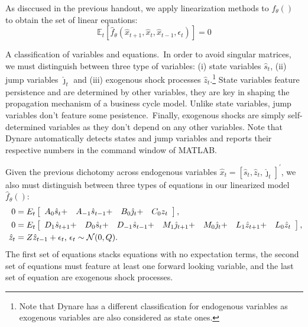 \documentclass[a4paper,12pt]{article}%
\begin{document}
As disccused in the previous handout, we apply linearization methods to
$f_{\theta}()$ to obtain the set of linear equations:%
\begin{equation}
\mathbb{E}_{t}\left[  \hat{f}_{\theta}\left(  \hat{x}_{t+1},\hat{x}_{t}%
,\hat{x}_{t-1},\epsilon_{t}\right)  \right]  =0 \label{eq: linear system}%
\end{equation}


\textsf{A classification of variables and equations.\ }In order to avoid
singular matrices, we must distinguish between three type of variables: (i)
state variables $\hat{s}_{t}$, (ii) jump variables $\hat{\jmath}_{t}$ and
(iii) exogenous shock processes $\hat{z}_{t}$.\footnote{Note that Dynare has a
different classification for endogenous variables as exogenous variables are
also considered as state ones.} State variables feature persistence and are
determined by other variables, they are key in shaping the propagation
mechanism of a business cycle model. Unlike state variables, jump variables
don't feature some pesistence.\ Finally, exogenous shocks are simply
self-determined variables as they don't depend on any other variables. Note
that Dynare automatically detects states and jump variables and reports their
respective numbers in the command window of MATLAB.

Given the previous dichotomy across endogenous variables $\hat{x}_{t}=[\hat
{s}_{t},\hat{z}_{t},\hat{\jmath}_{t}]^{\prime}$, we also must distinguish
between three types of equations in our linearized model $\hat{f}_{\theta}()$:
\
\begin{align}
0  &  =E_{t}\left[
\begin{array}
[c]{cccc}%
A_{0}\hat{s}_{t}+ & A_{-1}\hat{s}_{t-1}+ & B_{0}\hat{\jmath}_{t}+ & C_{0}z_{t}%
\end{array}
\right]  ,\label{eq: sys1}\\
0  &  =E_{t}\left[
\begin{array}
[c]{ccccccc}%
D_{1}\hat{s}_{t+1}+ & D_{0}\hat{s}_{t}+ & D_{-1}\hat{s}_{t-1}+ & M_{1}%
\hat{\jmath}_{t+1}+ & M_{0}\hat{\jmath}_{t}+ & L_{1}\hat{z}_{t+1}+ & L_{0}%
\hat{z}_{t}%
\end{array}
\right]  ,\label{eq: sys2}\\
\ \hat{z}_{t}  &  =Z\hat{z}_{t-1}+\epsilon_{t}\text{, }\epsilon_{t}%
\sim\mathcal{N}(0,Q).\ \label{eq: sys3}%
\end{align}
The first set of equations stacks equations with no expectation terms, the
second set of equations must feature at least one forward looking variable,
and the last set of equation are exogenous shock processes.
\end{document}
